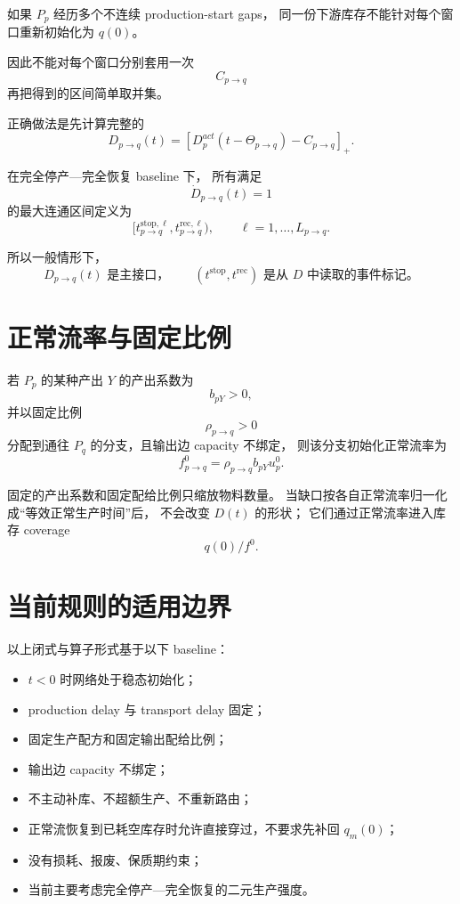 \documentclass[UTF8,11pt]{ctexart}
\begin{document}
如果 \(P_p\) 经历多个不连续 production-start gaps，
同一份下游库存不能针对每个窗口重新初始化为 \(q(0)\)。

因此不能对每个窗口分别套用一次
\[
C_{p\to q}
\]
再把得到的区间简单取并集。

正确做法是先计算完整的
\[
D_{p\to q}(t)
=
[D_p^{act}(t-\Theta_{p\to q})-C_{p\to q}]_+.
\]

在完全停产---完全恢复 baseline 下，
所有满足
\[
\dot D_{p\to q}(t)=1
\]
的最大连通区间定义为
\[
\boxed{
[t_{p\to q}^{\mathrm{stop},\ell},
t_{p\to q}^{\mathrm{rec},\ell}),
\qquad
\ell=1,\ldots,L_{p\to q}.
}
\tag{30}
\]

所以一般情形下，
\[
\boxed{
D_{p\to q}(t)
\text{ 是主接口，}
\qquad
(t^{\mathrm{stop}},t^{\mathrm{rec}})
\text{ 是从 \(D\) 中读取的事件标记。}
}
\]

\section{正常流率与固定比例}

若 \(P_p\) 的某种产出 \(Y\) 的产出系数为
\[
b_{pY}>0,
\]
并以固定比例
\[
\rho_{p\to q}>0
\]
分配到通往 \(P_q\) 的分支，且输出边 capacity 不绑定，
则该分支初始化正常流率为
\[
\boxed{
f_{p\to q}^0
=
\rho_{p\to q}b_{pY}u_p^0.
}
\tag{31}
\]

固定的产出系数和固定配给比例只缩放物料数量。
当缺口按各自正常流率归一化成“等效正常生产时间”后，
不会改变 \(D(t)\) 的形状；
它们通过正常流率进入库存 coverage
\[
q(0)/f^0.
\]

\section{当前规则的适用边界}

以上闭式与算子形式基于以下 baseline：
\begin{itemize}
    \item \(t<0\) 时网络处于稳态初始化；
    \item production delay 与 transport delay 固定；
    \item 固定生产配方和固定输出配给比例；
    \item 输出边 capacity 不绑定；
    \item 不主动补库、不超额生产、不重新路由；
    \item 正常流恢复到已耗空库存时允许直接穿过，不要求先补回 \(q_m(0)\)；
    \item 没有损耗、报废、保质期约束；
    \item 当前主要考虑完全停产---完全恢复的二元生产强度。
\end{itemize}
\end{document}
